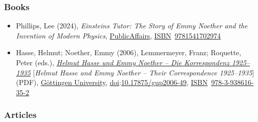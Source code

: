 \subsubsection{Books}\label{Books}

\begin{itemize}
\tightlist
\item
  {Phillips, Lee (2024), \emph{Einstein\textquotesingle s Tutor: The Story of Emmy Noether and the Invention of Modern Physics}, \href{https://en.wikipedia.org/wiki/PublicAffairs}{PublicAffairs}, \href{https://en.wikipedia.org/wiki/ISBN_(identifier)}{ISBN}{~}\href{https://en.wikipedia.org/wiki/Special:BookSources/9781541702974}{9781541702974}{}}
\item
  {Hasse, Helmut; Noether, Emmy (2006), Lemmermeyer, Franz; Roquette, Peter (eds.), \href{http://univerlag.uni-goettingen.de/handle/3/isbn-3-938616-35-0}{\emph{Helmut Hasse und Emmy Noether -- Die Korrespondenz 1925--1935}} {{[}}\emph{Helmut Hasse and Emmy Noether -- Their Correspondence 1925--1935}{{]}} {(PDF)}, \href{https://en.wikipedia.org/wiki/Göttingen_University}{Göttingen University}, \href{https://en.wikipedia.org/wiki/Doi_(identifier)}{doi}:{\href{https://doi.org/10.17875\%2Fgup2006-49}{10.17875/gup2006-49}}, \href{https://en.wikipedia.org/wiki/ISBN_(identifier)}{ISBN}{~}\href{https://en.wikipedia.org/wiki/Special:BookSources/978-3-938616-35-2}{978-3-938616-35-2}{}}
\end{itemize}


\subsubsection{Articles}\label{Articles}


